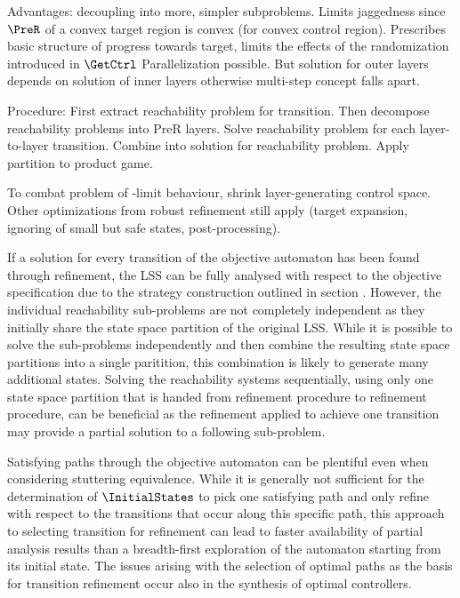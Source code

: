    Advantages: decoupling into more, simpler subproblems.
    Limits jaggedness since $\PreR$ of a convex target region is convex (for convex control region).
    Prescribes basic structure of progress towards target, limits the effects of the randomization introduced in $\GetCtrl$
    Parallelization possible.
    But solution for outer layers depends on solution of inner layers otherwise multi-step concept falls apart.

    Procedure:
    First extract reachability problem for transition.
    Then decompose reachability problems into PreR layers. %
    Solve reachability problem for each layer-to-layer transition.
    Combine into solution for reachability problem.
    Apply partition to product game.

    To combat problem of \epsilon-limit behaviour, shrink layer-generating control space.
    Other optimizations from robust refinement still apply (target expansion, ignoring of small but safe states, post-processing).

\stopsubsection


\startsubsection[title={Transition Selection},reference=refinement-transition-selection]

    If a solution for every transition of the objective automaton has been found through refinement, the LSS can be fully analysed with respect to the objective specification due to the strategy construction outlined in section .
    However, the individual reachability sub-problems are not completely independent as they initially share the state space partition of the original LSS.
    While it is possible to solve the sub-problems independently and then combine the resulting state space partitions into a single paritition, this combination is likely to generate many additional states.
    Solving the reachability systems sequentially, using only one state space partition that is handed from refinement procedure to refinement procedure, can be beneficial as the refinement applied to achieve one transition may provide a partial solution to a following sub-problem.

    Satisfying paths through the objective automaton can be plentiful even when considering stuttering equivalence.
    While it is generally not sufficient for the determination of $\InitialStates$ to pick one satisfying path and only refine with respect to the transitions that occur along this specific path, this approach to selecting transition for refinement can lead to faster availability of partial analysis results than a breadth-first exploration of the automaton starting from its initial state.
    The issues arising with the selection of optimal paths as the basis for transition refinement occur also in the synthesis of optimal controllers.

\stopsubsection

